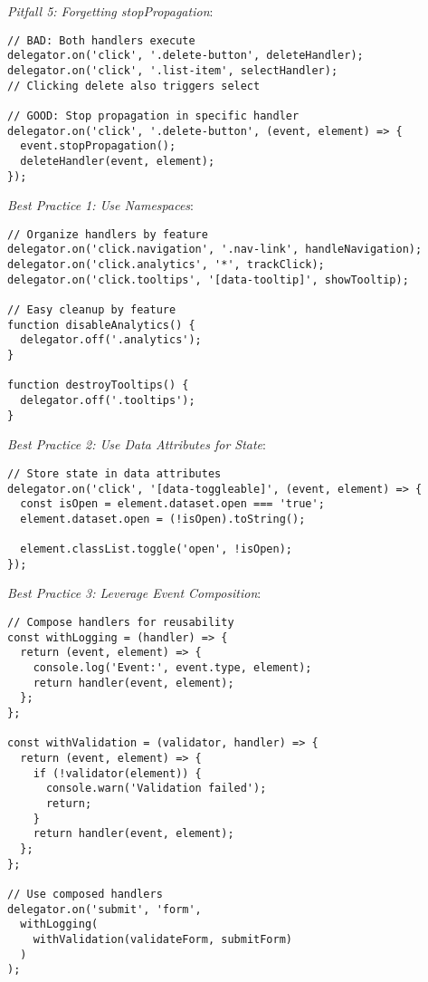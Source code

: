 \documentclass[11pt]{article}
\begin{document}
\emph{Pitfall 5: Forgetting stopPropagation}:

\begin{verbatim}
// BAD: Both handlers execute
delegator.on('click', '.delete-button', deleteHandler);
delegator.on('click', '.list-item', selectHandler);
// Clicking delete also triggers select

// GOOD: Stop propagation in specific handler
delegator.on('click', '.delete-button', (event, element) => {
  event.stopPropagation();
  deleteHandler(event, element);
});
\end{verbatim}

\emph{Best Practice 1: Use Namespaces}:

\begin{verbatim}
// Organize handlers by feature
delegator.on('click.navigation', '.nav-link', handleNavigation);
delegator.on('click.analytics', '*', trackClick);
delegator.on('click.tooltips', '[data-tooltip]', showTooltip);

// Easy cleanup by feature
function disableAnalytics() {
  delegator.off('.analytics');
}

function destroyTooltips() {
  delegator.off('.tooltips');
}
\end{verbatim}

\emph{Best Practice 2: Use Data Attributes for State}:

\begin{verbatim}
// Store state in data attributes
delegator.on('click', '[data-toggleable]', (event, element) => {
  const isOpen = element.dataset.open === 'true';
  element.dataset.open = (!isOpen).toString();
  
  element.classList.toggle('open', !isOpen);
});
\end{verbatim}

\emph{Best Practice 3: Leverage Event Composition}:

\begin{verbatim}
// Compose handlers for reusability
const withLogging = (handler) => {
  return (event, element) => {
    console.log('Event:', event.type, element);
    return handler(event, element);
  };
};

const withValidation = (validator, handler) => {
  return (event, element) => {
    if (!validator(element)) {
      console.warn('Validation failed');
      return;
    }
    return handler(event, element);
  };
};

// Use composed handlers
delegator.on('submit', 'form',
  withLogging(
    withValidation(validateForm, submitForm)
  )
);
\end{verbatim}
\end{document}
